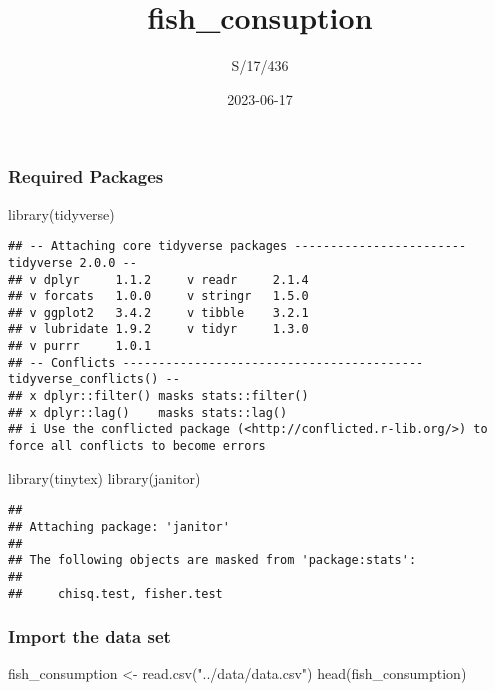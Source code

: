 \documentclass[
]{article}
\title{fish\_consuption}
\author{S/17/436}
\date{2023-06-17}
\newenvironment{Shaded}{\begin{snugshade}}{\end{snugshade}}
\newcommand{\FunctionTok}[1]{\textcolor[rgb]{0.00,0.00,0.00}{#1}}
\newcommand{\NormalTok}[1]{#1}
\newcommand{\OtherTok}[1]{\textcolor[rgb]{0.56,0.35,0.01}{#1}}
\newcommand{\StringTok}[1]{\textcolor[rgb]{0.31,0.60,0.02}{#1}}
\begin{document}
\maketitle

\hypertarget{required-packages}{%
\subsubsection{Required Packages}\label{required-packages}}

\begin{Shaded}
\begin{Highlighting}[]
\FunctionTok{library}\NormalTok{(tidyverse)}
\end{Highlighting}
\end{Shaded}

\begin{verbatim}
## -- Attaching core tidyverse packages ------------------------ tidyverse 2.0.0 --
## v dplyr     1.1.2     v readr     2.1.4
## v forcats   1.0.0     v stringr   1.5.0
## v ggplot2   3.4.2     v tibble    3.2.1
## v lubridate 1.9.2     v tidyr     1.3.0
## v purrr     1.0.1     
## -- Conflicts ------------------------------------------ tidyverse_conflicts() --
## x dplyr::filter() masks stats::filter()
## x dplyr::lag()    masks stats::lag()
## i Use the conflicted package (<http://conflicted.r-lib.org/>) to force all conflicts to become errors
\end{verbatim}

\begin{Shaded}
\begin{Highlighting}[]
\FunctionTok{library}\NormalTok{(tinytex)}
\FunctionTok{library}\NormalTok{(janitor)}
\end{Highlighting}
\end{Shaded}

\begin{verbatim}
## 
## Attaching package: 'janitor'
## 
## The following objects are masked from 'package:stats':
## 
##     chisq.test, fisher.test
\end{verbatim}

\hypertarget{import-the-data-set}{%
\subsubsection{Import the data set}\label{import-the-data-set}}

\begin{Shaded}
\begin{Highlighting}[]
\NormalTok{fish\_consumption }\OtherTok{\textless{}{-}} \FunctionTok{read.csv}\NormalTok{(}\StringTok{"../data/data.csv"}\NormalTok{)}
\FunctionTok{head}\NormalTok{(fish\_consumption)}
\end{Highlighting}
\end{Shaded}
\end{document}
